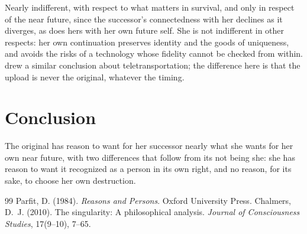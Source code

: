 \documentclass{situationist-preprint}
\begin{document}
\begin{reply}
Nearly indifferent, with respect to what matters in survival, and only in respect of the near future, since the successor's connectedness with her declines as it diverges, as does hers with her own future self. She is not indifferent in other respects: her own continuation preserves identity and the goods of uniqueness, and avoids the risks of a technology whose fidelity cannot be checked from within. \citet[ch.~12]{Parfit1984} drew a similar conclusion about teletransportation; the difference here is that the upload is never the original, whatever the timing.
\end{reply}

\section{Conclusion}

The original has reason to want for her successor nearly what she wants for her own near future, with two differences that follow from its not being she: she has reason to want it recognized as a person in its own right, and no reason, for its sake, to choose her own destruction.

\begin{thebibliography}{99}\small
{} Parfit, D. (1984). \emph{Reasons and Persons}. Oxford University Press.
 Chalmers, D.~J. (2010). The singularity: A philosophical analysis. \emph{Journal of Consciousness Studies}, 17(9--10), 7--65.
\end{thebibliography}
\end{document}
